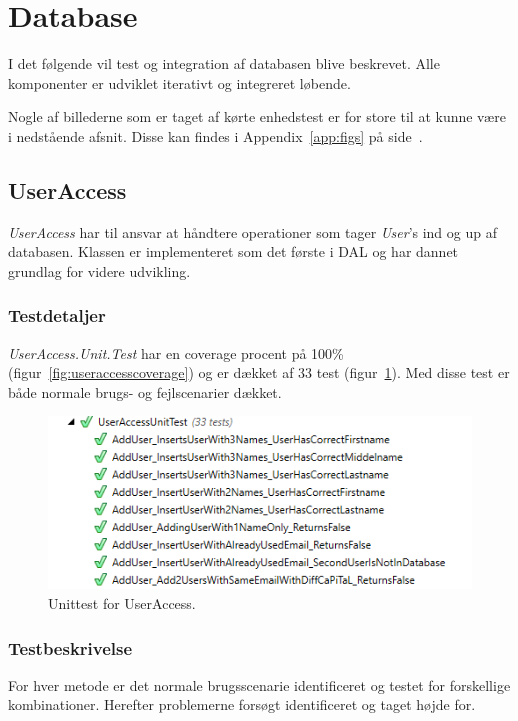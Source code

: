 \section{Database}\label{sec:testdatabase}
I det følgende vil test og integration af databasen blive beskrevet. Alle komponenter er udviklet iterativt og integreret løbende.

Nogle af billederne som er taget af kørte enhedstest er for store til at kunne være i nedstående afsnit. Disse kan findes i Appendix~\ref{app:figs} på side~\pageref{app:figs}.

\subsection{UserAccess}
\textit{UserAccess} har til ansvar at håndtere operationer som tager \textit{User}'s ind og up af databasen. Klassen er implementeret som det første i DAL og har dannet grundlag for videre udvikling.

\subsubsection{Testdetaljer}
\textit{UserAccess.Unit.Test} har en coverage procent på 100\% (figur~\ref{fig:useraccesscoverage}) og er dækket af 33 test (figur~\ref{fig:useraccessunittest}). Med disse test er både normale brugs- og fejlscenarier dækket.

\begin{figure}[H]
\centering
\includegraphics[width=0.9\linewidth]{figs/test/useraccessunittest}
\caption{Unittest for UserAccess.}
\label{fig:useraccessunittest}
\end{figure}

\subsubsection{Testbeskrivelse}
For hver metode er det normale brugsscenarie identificeret og testet for forskellige kombinationer. Herefter problemerne forsøgt identificeret og taget højde for.

